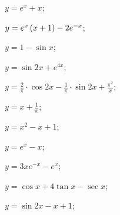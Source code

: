 \begin{enumsols}
		\label{sol:bvp_bvp:constcoeffs_nonhmg}
		\item \( y = e^{x} + x \); \sfill %
		\item \( y = e^{x} \left( x + 1 \right) - 2 e^{- x} \); \sfill %
		\item \( y = 1 - \sin{x} \); \sfill %
		\item \( y = \sin{2 x} + e^{4 x} \); \sfill %
		\item \( y = \frac{2}{\pi} \cdot \cos{2 x} - \frac{1}{\pi} \cdot \sin{2 x} + \frac{\pi^2}{x} \); \sfill %

		\label{sol:bvp_bvp:linear}
		\item \( y = x + \frac{1}{x} \); \sfill %
		\item \( y = x^2 - x + 1 \); \sfill %
		\item \( y = e^{x} - x \); \sfill %
		\item \( y = 3 x e^{- x} - e^{x} \); \sfill %
		\item \( y = \cos{x} + 4 \tan{x} - \sec{x} \); \sfill %
		\item \( y = \sin{2x} - x + 1 \); \sfill %
		

\end{enumsols}
